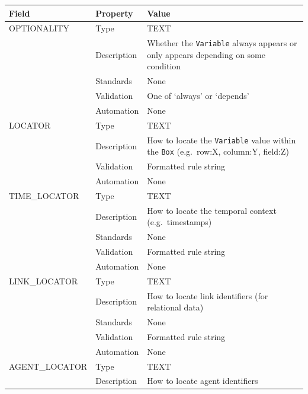 \documentclass[
]{article}
\newcounter{none} %
\begin{document}
{\def\LTcaptype{none} %
\begin{longtable}[]{@{}
  >{\raggedright\arraybackslash}p{}
  >{\raggedright\arraybackslash}p{}
  >{\raggedright\arraybackslash}p{}@{}}
\toprule\noalign{}
\begin{minipage}[b]{\linewidth}\raggedright
Field
\end{minipage} & \begin{minipage}[b]{\linewidth}\raggedright
Property
\end{minipage} & \begin{minipage}[b]{\linewidth}\raggedright
Value
\end{minipage} \\
\midrule\noalign{}
\endhead
\bottomrule\noalign{}
\endlastfoot
OPTIONALITY & Type & TEXT \\
& Description & Whether the \texttt{Variable} always appears or only
appears depending on some condition \\
& Standards & None \\
& Validation & One of `always' or `depends' \\
& Automation & None \\
LOCATOR & Type & TEXT \\
& Description & How to locate the \texttt{Variable} value within the
\texttt{Box} (e.g.~row:X, column:Y, field:Z) \\
& Validation & Formatted rule string \\
& Automation & None \\
TIME\_LOCATOR & Type & TEXT \\
& Description & How to locate the temporal context (e.g.~timestamps) \\
& Standards & None \\
& Validation & Formatted rule string \\
& Automation & None \\
LINK\_LOCATOR & Type & TEXT \\
& Description & How to locate link identifiers (for relational data) \\
& Standards & None \\
& Validation & Formatted rule string \\
& Automation & None \\
AGENT\_LOCATOR & Type & TEXT \\
& Description & How to locate agent identifiers \\

\end{longtable}}
\end{document}
